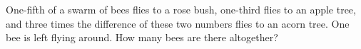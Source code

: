 One-fifth of a swarm of bees flies to a rose bush, one-third flies to an apple tree, and three times the difference of these two numbers flies to an acorn tree. One bee is left flying around. How many bees are there altogether?
